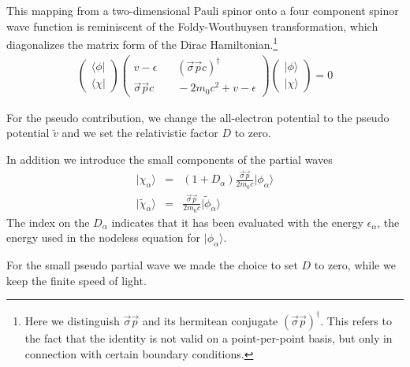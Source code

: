 \documentclass[11pt,a4paper]{report}
\begin{document}
This mapping from a two-dimensional Pauli spinor onto a four component
spinor wave function is reminiscent of the Foldy-Wouthuysen
transformation\cite{foldy50_pr78_29}, which diagonalizes the matrix
form of the Dirac Hamiltonian.\footnote{Here we distinguish
  $\vec{\sigma}\vec{p}$ and its hermitean conjugate
  $(\vec{\sigma}\vec{p})^\dagger$. This refers to the fact that the
  identity is not valid on a point-per-point basis, but only in
  connection with certain boundary conditions.}
\begin{eqnarray}
\left(\begin{array}{c}\langle\phi|\\
\langle\chi|\end{array}\right)
\left(\begin{array}{cc}
v-\epsilon &\quad (\vec{\sigma}\vec{p}c)^\dagger\\
\vec{\sigma}\vec{p}c &\quad -2m_0c^2+v-\epsilon\end{array}\right)
\left(\begin{array}{c}|\phi\rangle\\|\chi\rangle\end{array}\right)=0
\end{eqnarray}


For the pseudo contribution, we change the all-electron potential to
the pseudo potential $\tilde{v}$ and we set the relativistic factor
$D$ to zero. 

In addition we introduce the small components of the partial waves 
\begin{eqnarray}
|\chi_\alpha\rangle&=&(1+D_\alpha)\frac{\vec{\sigma}\vec{p}}{2m_0c}
|\phi_\alpha\rangle
\nonumber\\
|\tilde{\chi}_\alpha\rangle&=&\frac{\vec{\sigma}\vec{p}}{2m_0c}
|\tilde{\phi}_\alpha\rangle
\end{eqnarray}
The index on the $D_\alpha$ indicates that it has been evaluated with
the energy $\epsilon_\alpha$, the energy used in the nodeless equation
for $|\phi_\alpha\rangle$.

For the small pseudo partial wave we made the choice to set $D$ to
zero, while we keep the finite speed of light.
\end{document}
